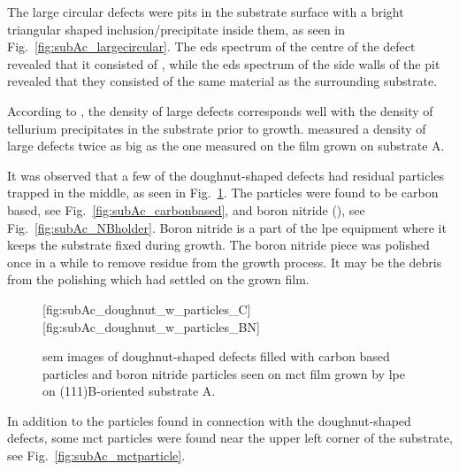 The large circular defects were pits in the substrate surface with a bright triangular shaped inclusion/precipitate inside them, as seen in Fig.~\ref{fig:subAc_largecircular}. The \ac{eds} spectrum of the centre of the defect revealed that it consisted of , while the \ac{eds} spectrum of the side walls of the pit revealed that they consisted of the same material as the surrounding substrate. %

According to \citet{pelliciari1994te}, the density of large defects corresponds well with the density of tellurium precipitates in the substrate prior to growth. \citet{pelliciari1994te} measured a density of large defects twice as big as the one measured on the film grown on substrate A. 

It was observed that a few of the doughnut-shaped defects had residual particles trapped in the middle, as seen in Fig.~\ref{fig:subAc_doughnut_w_particles}. The particles were found to be carbon based, see Fig.~\ref{fig:subAc_carbonbased}, and boron nitride (), see Fig.~\ref{fig:subAc_NBholder}. Boron nitride is a part of the \ac{lpe} equipment where it keeps the substrate fixed during growth. The boron nitride piece was polished once in a while to remove residue from the growth process. It may be the debris from the polishing which had settled on the grown film.

\begin{figure}[htbp]
    \centering
    [fig:subAc_doughnut_w_particles_C]
    \hfill
    [fig:subAc_doughnut_w_particles_BN]
    \caption[\Ac{sem} images of doughnut-shaped defects filled with carbon based particles and boron nitride particles.]{\Ac{sem} images of doughnut-shaped defects filled with  carbon based particles and  boron nitride particles seen on \ac{mct} film grown by \ac{lpe} on (111)B-oriented substrate A.}
    \label{fig:subAc_doughnut_w_particles}
\end{figure}

In addition to the particles found in connection with the doughnut-shaped defects, some \ac{mct} particles were found near the upper left corner of the substrate, see Fig.~\ref{fig:subAc_mctparticle}.

